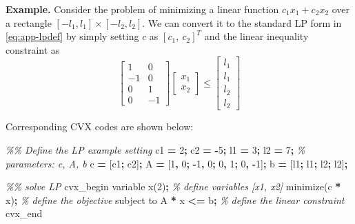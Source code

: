 \documentclass[
]{book}
\newenvironment{Shaded}{\begin{snugshade}}{\end{snugshade}}
\newcommand{\CommentTok}[1]{\textcolor[rgb]{0.56,0.35,0.01}{\textit{#1}}}
\newcommand{\FloatTok}[1]{\textcolor[rgb]{0.00,0.00,0.81}{#1}}
\newcommand{\NormalTok}[1]{#1}
\newcommand{\OperatorTok}[1]{\textcolor[rgb]{0.81,0.36,0.00}{\textbf{#1}}}
\newcommand{\VariableTok}[1]{\textcolor[rgb]{0.00,0.00,0.00}{#1}}
\theoremstyle{definition}
\theoremstyle{definition}
\theoremstyle{definition}
\theoremstyle{definition}
\theoremstyle{remark}
\begin{document}
\textbf{Example.} Consider the problem of minimizing a linear function \(c_1 x_1 + c_2 x_2\) over a rectangle \([-l_1, l_1] \times [-l_2, l_2]\). We can convert it to the standard LP form in \eqref{eq:app-lpdef} by simply setting \(c\) as \([c_1, \ c_2]^T\) and the linear inequality constraint as
\begin{equation*}
   \begin{bmatrix}
      1 & 0 \\ -1 & 0 \\ 0 & 1 \\ 0 & -1
   \end{bmatrix} \begin{bmatrix}
      x_1 \\ x_2
   \end{bmatrix} \le \begin{bmatrix}
      l_1 \\ l_1 \\ l_2 \\ l_2
   \end{bmatrix}
\end{equation*}

Corresponding CVX codes are shown below:

\begin{Shaded}
\begin{Highlighting}[]
\CommentTok{\%\% Define the LP example setting}
\VariableTok{c1} \OperatorTok{=} \FloatTok{2}\OperatorTok{;}
\VariableTok{c2} \OperatorTok{=} \OperatorTok{{-}}\FloatTok{5}\OperatorTok{;}
\VariableTok{l1} \OperatorTok{=} \FloatTok{3}\OperatorTok{;}
\VariableTok{l2} \OperatorTok{=} \FloatTok{7}\OperatorTok{;}
\CommentTok{\% parameters: c, A, b}
\VariableTok{c} \OperatorTok{=}\NormalTok{ [}\VariableTok{c1}\OperatorTok{;} \VariableTok{c2}\NormalTok{]}\OperatorTok{;}
\VariableTok{A} \OperatorTok{=}\NormalTok{ [}\FloatTok{1}\OperatorTok{,} \FloatTok{0}\OperatorTok{;} \OperatorTok{{-}}\FloatTok{1}\OperatorTok{,} \FloatTok{0}\OperatorTok{;} \FloatTok{0}\OperatorTok{,} \FloatTok{1}\OperatorTok{;} \FloatTok{0}\OperatorTok{,} \OperatorTok{{-}}\FloatTok{1}\NormalTok{]}\OperatorTok{;}
\VariableTok{b} \OperatorTok{=}\NormalTok{ [}\VariableTok{l1}\OperatorTok{;} \VariableTok{l1}\OperatorTok{;} \VariableTok{l2}\OperatorTok{;} \VariableTok{l2}\NormalTok{]}\OperatorTok{;}

\CommentTok{\%\% solve LP}
\VariableTok{cvx\_begin}
    \VariableTok{variable} \VariableTok{x}\NormalTok{(}\FloatTok{2}\NormalTok{)}\OperatorTok{;} \CommentTok{\% define variables [x1, x2]}
    \VariableTok{minimize}\NormalTok{(}\VariableTok{c}\OperatorTok{\textquotesingle{}} \OperatorTok{*} \VariableTok{x}\NormalTok{)}\OperatorTok{;} \CommentTok{\% define the objective}
    \VariableTok{subject} \VariableTok{to}
        \VariableTok{A} \OperatorTok{*} \VariableTok{x} \OperatorTok{\textless{}=} \VariableTok{b}\OperatorTok{;} \CommentTok{\% define the linear constraint}
\VariableTok{cvx\_end}
\end{Highlighting}
\end{Shaded}
\end{document}
